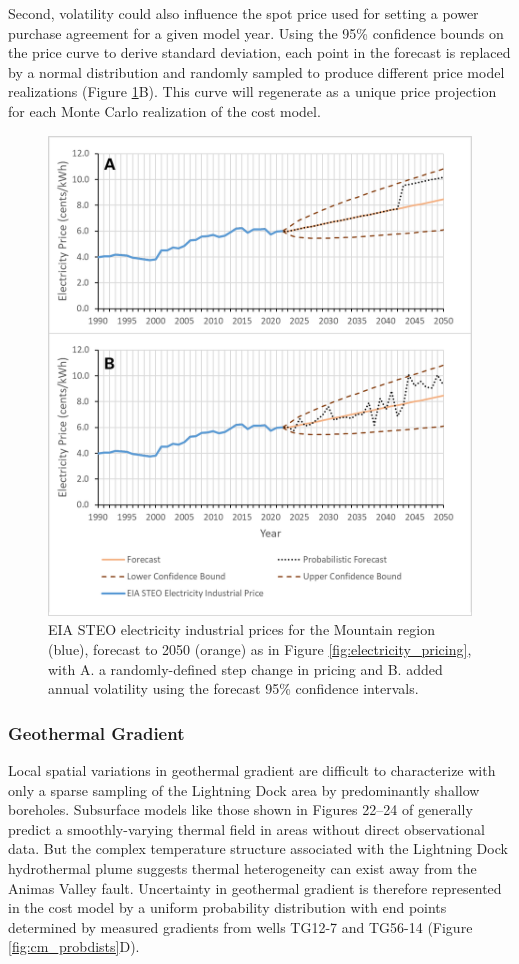 Second, volatility could also influence the spot price used for setting a power purchase agreement for a given model year. Using the 95\% confidence bounds on the price curve to derive standard deviation, each point in the forecast is replaced by a normal distribution and randomly sampled to produce different price model realizations (Figure \ref{fig:elec_price_prob}B). This curve will regenerate as a unique price projection for each Monte Carlo realization of the cost model.

\begin{figure}[htp]
\centering
\includegraphics[width=.85\textwidth]{templates/images/Figure-ElectPrice_Prob.png}
\singlespacing
\caption[Cost model probabilistic price forecasts]{EIA STEO electricity industrial prices for the Mountain region (blue), forecast to 2050 (orange) as in Figure \ref{fig:electricity_pricing}, with A. a randomly-defined step change in pricing and B. added annual volatility using the forecast 95\% confidence intervals.}
\label{fig:elec_price_prob}
\end{figure}

\subsubsection{Geothermal Gradient}\label{cm4:prob_gradient}
Local spatial variations in geothermal gradient are difficult to characterize with only a sparse sampling of the Lightning Dock area by predominantly shallow boreholes. Subsurface models like those shown in Figures 22--24 of \citep{cunniff_final_2005} generally predict a smoothly-varying thermal field in areas without direct observational data. But the complex temperature structure associated with the Lightning Dock hydrothermal plume suggests thermal heterogeneity can exist away from the Animas Valley fault. Uncertainty in geothermal gradient is therefore represented in the cost model by a uniform probability distribution with end points determined by measured gradients from wells TG12-7 and TG56-14 (Figure \ref{fig:cm_probdists}D).

